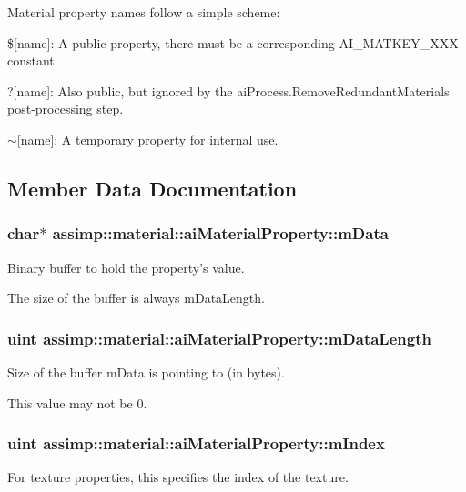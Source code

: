 Material property names follow a simple scheme\+:

{\ttfamily \$\mbox{[}name\mbox{]}}\+: A public property, there must be a corresponding A\+I\+\_\+\+M\+A\+T\+K\+E\+Y\+\_\+\+X\+X\+X constant.

{\ttfamily ?\mbox{[}name\mbox{]}}\+: Also public, but ignored by the {\ttfamily ai\+Process.\+Remove\+Redundant\+Materials} post-\/processing step.

{\ttfamily $\sim$\mbox{[}name\mbox{]}}\+: A temporary property for internal use. 

\subsection{Member Data Documentation}
\hypertarget{structassimp_1_1material_1_1ai_material_property_adf2f2f2289591165b4a56435f9ca8c02}{
\subsubsection[{m\+Data}]{\setlength{\rightskip}{0pt plus 5cm}char$\ast$ assimp\+::material\+::ai\+Material\+Property\+::m\+Data}}\label{structassimp_1_1material_1_1ai_material_property_adf2f2f2289591165b4a56435f9ca8c02}
Binary buffer to hold the property's value.

The size of the buffer is always {\ttfamily m\+Data\+Length}. \hypertarget{structassimp_1_1material_1_1ai_material_property_a05a3fdd6e28bc2246d56162cf5f68bc2}{
\subsubsection[{m\+Data\+Length}]{\setlength{\rightskip}{0pt plus 5cm}uint assimp\+::material\+::ai\+Material\+Property\+::m\+Data\+Length}}\label{structassimp_1_1material_1_1ai_material_property_a05a3fdd6e28bc2246d56162cf5f68bc2}
Size of the buffer {\ttfamily m\+Data} is pointing to (in bytes).

This value may not be 0. \hypertarget{structassimp_1_1material_1_1ai_material_property_ae24935f31f41f397e9558a2f9022b066}{
\subsubsection[{m\+Index}]{\setlength{\rightskip}{0pt plus 5cm}uint assimp\+::material\+::ai\+Material\+Property\+::m\+Index}}\label{structassimp_1_1material_1_1ai_material_property_ae24935f31f41f397e9558a2f9022b066}
For texture properties, this specifies the index of the texture.

